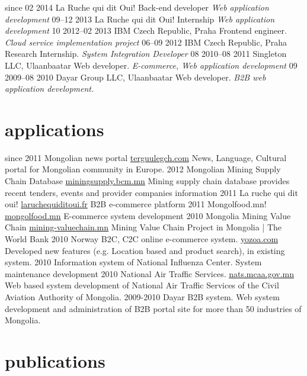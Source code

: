 \documentclass[backend=biber, print]{friggeri-cv}
\begin{document}
\begin{entrylist}
  \entry
    {since 02 2014}
    {La Ruche qui dit Oui!}
    {Back-end developer}
    {\emph{Web application development}}
  \entry
    {09–12 2013}
    {La Ruche qui dit Oui!}
    {Internship}
    {\emph{Web application development}}
  \entry
    {10 2012–02 2013}
    {IBM Czech Republic, Praha}
    {Frontend engineer.}
    {\emph{Cloud service implementation project}}
  \entry
    {06–09 2012}
    {IBM Czech Republic, Praha}
    {Research Internship.}
    {\emph{System Integration Developer}}
  \entry
    {08 2010–08 2011}
    {Singleton LLC, Ulaanbaatar}
    {Web developer.}
    {\emph{E-commerce, Web application development}}
  \entry
    {09 2009–08 2010}
    {Dayar Group LLC, Ulaanbaatar}
    {Web developer.}
    {\emph{B2B web application development.}}
\end{entrylist}

\section{applications}

\begin{entrylist}
  \entry
    {since 2011}
    {Mongolian news portal}
    {\href{http://terguulegch.com}{terguulegch.com}}
    {News, Language, Cultural portal for Mongolian community in Europe.}
  \entry
    {2012}
    {Mongolian Mining Supply Chain Database}
    {\href{http://miningsupply.bcm.mn}{miningsupply.bcm.mn}}
    {Mining supply chain database provides recent tenders, events and provider companies information }
  \entry
    {2011}
    {La ruche qui dit oui!}
    {\href{http://www.laruchequiditoui.fr}{laruchequiditoui.fr}}
    {B2B e-commerce platform}
  \entry
    {2011}
    {Mongolfood.mn!}
    {\href{http://mongolfood.mn/}{mongolfood.mn}}
    {E-commerce system development}
  \entry
    {2010}
    {Mongolia Mining Value Chain}
    {\href{http://mining-valuechain.eri.mn}{mining-valuechain.mn}}
    {Mining Value Chain Project in Mongolia | The World Bank}
  \entry
    {2010}
    {Norway B2C, C2C online e-commerce system.}
    {\href{http://dev.yozoa.com}{yozoa.com}}
    {Developed new features (e.g. Location based and product search),  in existing system.}
  \entry
    {2010}
    {Information system of National Influenza Center.}
    {}
    {System maintenance development}
  \entry
    {2010}
    {National Air Traffic Services.}
    {\href{http://nats.mcaa.gov.mn/}{nats.mcaa.gov.mn}}
    {Web based system development of National Air Traffic Services of the Civil Aviation Authority of Mongolia.}
  \entry
    {2009-2010}
    {Dayar B2B system.}
    {}
    {Web system development and administration of B2B portal site for more than 50 industries of Mongolia.}
\end{entrylist}

\section{publications}

\begin{refsection}
  \nocite{*}
    \printbibliography[sorting=chronological, type=inproceedings, title={international peer-reviewed conferences/proceedings}, notkeyword={france}, heading=subbibliography]
    \end{refsection}
\end{document}

